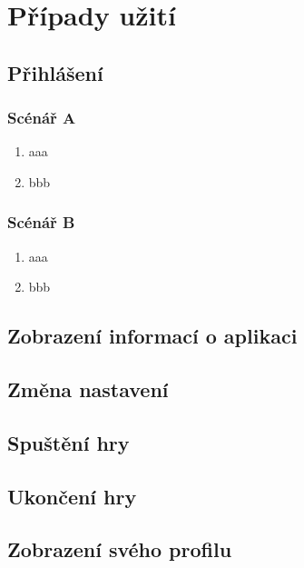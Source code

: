 \let\oldsubsection=\thesubsection
\renewcommand\thesubsection{UC\arabic{subsection}} %

\section{Případy užití}

\subsection*{Přihlášení}
\label{uc:login}

\subsubsection*{Scénář A}

\begin{enumerate}
    \item aaa
    \item bbb
\end{enumerate}

\subsubsection*{Scénář B}

\begin{enumerate}
    \item aaa
    \item bbb
\end{enumerate}

\subsection{Zobrazení informací o aplikaci}

\subsection{Změna nastavení}


\subsection{Spuštění hry}


\subsection{Ukončení hry}


\subsection{Zobrazení svého profilu}

\let\thesubsection=\oldsubsection
